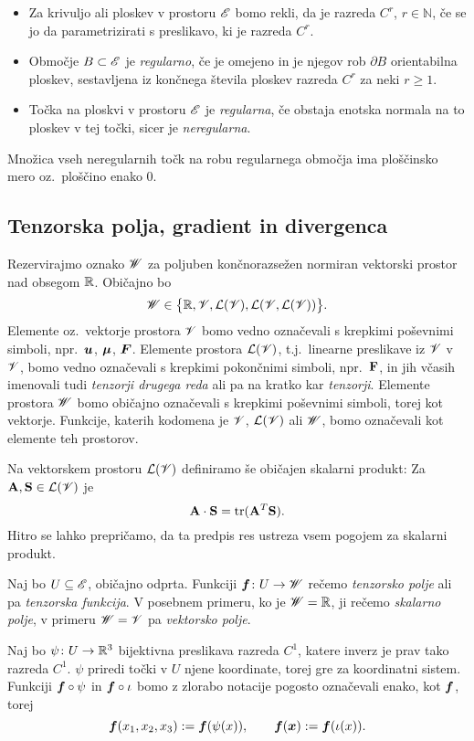 \begin{definicija}
	\begin{itemize}
		\item
		Za krivuljo ali ploskev v prostoru $\mathscr E$ bomo rekli, da je razreda $C^r$, $r\in\mathbb{N}$, če se jo da
		parametrizirati s preslikavo, ki je razreda $C^r$.
		\item
		Območje $B\subset\mathscr E$ je \emph{regularno}, če je omejeno in je njegov rob $\partial B$
		orientabilna ploskev, sestavljena iz končnega števila ploskev razreda $C^r$ za neki $r\geq 1$.
		\item
		Točka na ploskvi v prostoru $\mathscr E$ je \emph{regularna}, če obstaja enotska normala
		na to ploskev v tej točki, sicer je \emph{neregularna}.
	\end{itemize}
\end{definicija}
Množica vseh neregularnih točk na robu regularnega območja ima ploščinsko mero oz.~ploščino enako 0.


\subsection{Tenzorska polja, gradient in divergenca}


Rezervirajmo oznako $\mathscr W$ za poljuben končnorazsežen normiran vektorski
prostor nad obsegom $\mathbb R$. Običajno bo
\[ \mathscr W\in\big\{ \mathbb R,\mathscr V,\mathcal L(\mathscr V),\mathcal L(\mathscr V,\mathcal L(\mathscr V)) \big\}. \]
Elemente oz.~vektorje prostora $\mathscr V$ bomo vedno označevali s krepkimi poševni\-mi simboli,
npr.~$\boldsymbol u$, $\boldsymbol \mu$, $\boldsymbol F$. Elemente prostora $\mathcal L(\mathscr V)$, t.j.~linearne
preslikave iz $\mathscr V$ v $\mathscr V$, bomo vedno označevali s krepkimi pokončnimi simboli, npr.~$\mathbf F$,
in jih včasih imenovali tudi \emph{tenzorji drugega reda} ali pa na kratko kar \emph{tenzorji}.
Elemente prostora $\mathscr W$ bomo običajno označevali s krepkimi poševnimi simboli, torej kot vektorje.
Funkcije, katerih kodomena je $\mathscr V$, $\mathcal L(\mathscr V)$ ali $\mathscr W$, bomo označevali kot elemente teh prostorov.

Na vektorskem prostoru $\mathcal L(\mathscr V)$ definiramo še običajen skalarni produkt: Za $\mathbf A,\mathbf S\in\mathcal L(\mathscr V)$ je
\[ \mathbf A\cdot\mathbf S=\mathrm{tr}(\mathbf A^{T}\mathbf S). \]
Hitro se lahko prepričamo, da ta predpis res ustreza vsem pogojem za skalarni produkt.

Naj bo $U\subseteq\mathscr E$, običajno odprta. Funkciji $\boldsymbol f\colon U\to\mathscr W$ rečemo \emph{tenzorsko polje} ali pa
\emph{tenzorska funkcija}. V posebnem primeru, ko je $\mathscr W=\mathbb R$, ji rečemo \emph{skalarno polje},
v primeru $\mathscr W=\mathscr V$ pa \emph{vektorsko polje}.

Naj bo $\psi\colon U\to\mathbb R^3$ bijektivna preslikava razreda $C^1$, katere inverz je prav tako
razreda $C^1$. $\psi$ priredi točki v $U$ njene koordinate, torej gre za koordinatni sistem.
Funkciji $\boldsymbol f\circ\psi$ in $\boldsymbol f\circ\iota$ bomo z zlorabo notacije pogosto označevali
enako, kot $\boldsymbol f$, torej
\[
	\boldsymbol f(x_1,x_2,x_3):=\boldsymbol f(\psi(x)),\qquad\boldsymbol f(\boldsymbol x):=\boldsymbol f(\iota(x)).
\]


